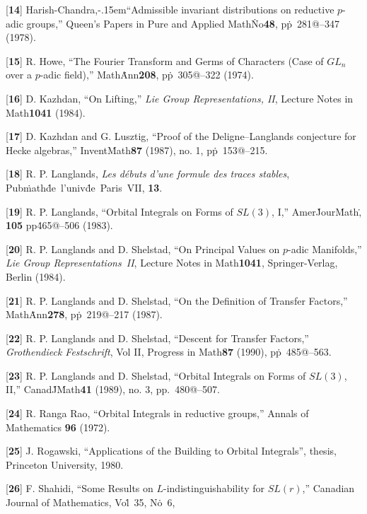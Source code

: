 %
\item{[{\bf 14}]}
  Harish-Chandra\hbox{,\kern-.15em``}Admissible invariant distributions on reductive $p$-adic 
    groups,''
  Queen's Papers in Pure and Applied Math\. No\. {\bf 48}, pp\.~281@--347
  (1978).
%
\item{[{\bf 15}]}
  R. Howe,
  ``The Fourier Transform and Germs of Characters (Case of $GL_n$ 
    over a $p$-adic field),''
  Math\. Ann\. {\bf 208}, pp\.~305@--322 (1974).
%
\item{[{\bf 16}]}
  D. Kazhdan,
  ``On Lifting,'' {\sl Lie Group Representations, II},
  Lecture Notes in Math\. {\bf 1041} (1984).
%
\item{[{\bf 17}]}
  D. Kazhdan and G. Lusztig,
  ``Proof of the Deligne--Langlands conjecture for Hecke algebras,''
  Invent\. Math\. {\bf 87} (1987), no. 1, pp\.~153@--215.
%
\item{[{\bf 18}]}
  R. P. Langlands,
  {\sl Les d\'ebuts d'une formule des traces stables},
  Pub\. math\. de~l'univ\. de~Paris~VII, {\bf 13}.
%
\item{[{\bf 19}]}
  R. P. Langlands,
  ``Orbital Integrals on Forms of $SL(3)$, I,''
  Amer\. Jour\. Math\., {\bf 105} pp\. 465@--506
  (1983).
%
\item{[{\bf 20}]}
  R. P. Langlands and D. Shelstad,
  ``On Principal Values on $p$-adic Manifolds,''
  {\sl Lie Group Representations~II}, Lecture Notes in Math\.
  {\bf 1041}, Springer-Verlag, Berlin (1984).
%
\item{[{\bf 21}]}
  R. P. Langlands and D. Shelstad,
  ``On the Definition of Transfer Factors,''
  Math\. Ann\. {\bf 278}, pp\.~219@--217 (1987).
%
\item{[{\bf 22}]}
  R. P. Langlands and D. Shelstad,
  ``Descent for Transfer Factors,''
  {\sl Grothendieck Festschrift}, Vol II,
  Progress in Math\. {\bf 87} (1990), pp\.~485@--563.
%
\item{[{\bf 23}]}
  R. P. Langlands and D. Shelstad,
  ``Orbital Integrals on Forms of $SL(3)$, II,''
  Canad\. J\. Math\. {\bf 41} (1989), no. 3, pp.~480@--507.
%  
\item{[{\bf 24}]}
  R. Ranga Rao,
  ``Orbital Integrals in reductive groups,''
  Annals of Mathematics {\bf 96} (1972).
%
\item{[{\bf 25}]}
  J. Rogawski,
  ``Applications of the Building to Orbital Integrals'',
  thesis, Princeton University, 1980.
%
\item{[{\bf 26}]}
  F. Shahidi,
  ``Some Results on $L$-indistinguishability for $SL(r)$,''
  Canadian Journal of Mathematics, Vol\.~35, No\.~6,
